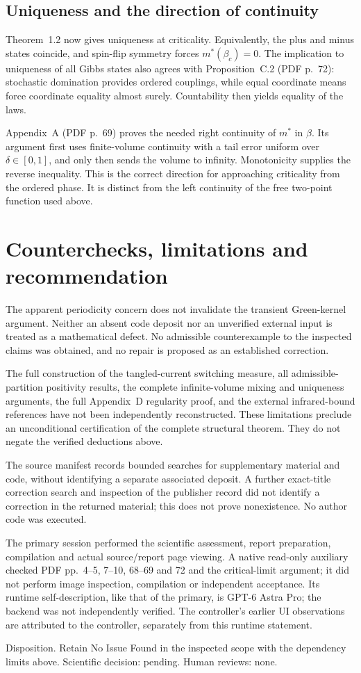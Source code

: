 \documentclass[10pt]{article}
\begin{document}
\subsection*{Uniqueness and the direction of continuity}
Theorem 1.2 now gives uniqueness at criticality. Equivalently, the plus and minus states coincide, and spin-flip symmetry forces \(m^*(\beta_c)=0\). The implication to uniqueness of all Gibbs states also agrees with Proposition C.2 (PDF p. 72): stochastic domination provides ordered couplings, while equal coordinate means force coordinate equality almost surely. Countability then yields equality of the laws.\par
Appendix A (PDF p. 69) proves the needed right continuity of \(m^*\) in \(\beta\). Its argument first uses finite-volume continuity with a tail error uniform over \(\delta\in[0,1]\), and only then sends the volume to infinity. Monotonicity supplies the reverse inequality. This is the correct direction for approaching criticality from the ordered phase. It is distinct from the left continuity of the free two-point function used above.\par
\section*{Counterchecks, limitations and recommendation}
The apparent periodicity concern does not invalidate the transient Green-kernel argument. Neither an absent code deposit nor an unverified external input is treated as a mathematical defect. No admissible counterexample to the inspected claims was obtained, and no repair is proposed as an established correction.\par
The full construction of the tangled-current switching measure, all admissible-partition positivity results, the complete infinite-volume mixing and uniqueness arguments, the full Appendix D regularity proof, and the external infrared-bound references have not been independently reconstructed. These limitations preclude an unconditional certification of the complete structural theorem. They do not negate the verified deductions above.\par
The source manifest records bounded searches for supplementary material and code, without identifying a separate associated deposit. A further exact-title correction search and inspection of the publisher record did not identify a correction in the returned material; this does not prove nonexistence. No author code was executed.\par
The primary session performed the scientific assessment, report preparation, compilation and actual source/report page viewing. A native read-only auxiliary checked PDF pp. 4–5, 7–10, 68–69 and 72 and the critical-limit argument; it did not perform image inspection, compilation or independent acceptance. Its runtime self-description, like that of the primary, is GPT-6 Astra Pro; the backend was not independently verified. The controller’s earlier UI observations are attributed to the controller, separately from this runtime statement.\par
Disposition. Retain No Issue Found in the inspected scope with the dependency limits above. Scientific decision: pending. Human reviews: none.\par
\end{document}
